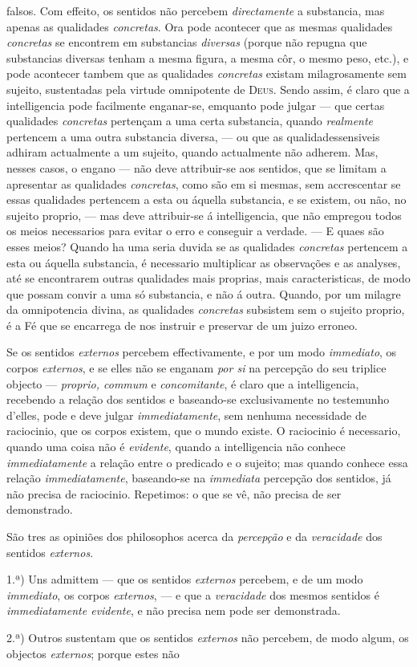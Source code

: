 falsos. Com effeito, os sentidos não percebem \emph{directamente} a substancia, mas apenas as qualidades \emph{concretas}. Ora pode acontecer que as mesmas qualidades \emph{concretas} se encontrem em substancias \emph{diversas} (porque não repugna que substancias diversas tenham a mesma figura, a mesma côr, o mesmo peso, etc.), e pode acontecer tambem que as qualidades \emph{concretas} existam milagrosamente sem sujeito, sustentadas pela virtude omnipotente de \textsc{Deus}. Sendo assim, é claro que a intelligencia pode facilmente enganar-se, emquanto pode julgar --- que certas qualidades \emph{concretas} pertençam a uma certa substancia, quando \emph{realmente} pertencem a uma outra substancia diversa, --- ou que as qualidadessensiveis adhiram actualmente a um sujeito, quando actualmente não adherem. Mas, nesses casos, o engano --- não deve attribuir-se aos sentidos, que se limitam a apresentar as qualidades \emph{concretas}, como são em si mesmas, sem accrescentar se essas qualidades pertencem a esta ou áquella substancia, e se existem, ou não, no sujeito proprio, --- mas deve attribuir-se á intelligencia, que não empregou todos os meios necessarios para evitar o erro e conseguir a verdade. --- E quaes são esses meios? Quando ha uma seria duvida se as qualidades \emph{concretas} pertencem a esta ou áquella substancia, é necessario multiplicar as observações e as analyses, até se encontrarem outras qualidades mais proprias, mais caracteristicas, de modo que possam convir a uma só substancia, e não á outra. Quando, por um milagre da omnipotencia divina, as qualidades \emph{concretas} subsistem sem o sujeito proprio, é a Fé que se encarrega de nos instruir e preservar de um juizo erroneo.\par Se os sentidos \emph{externos} percebem effectivamente, e por um modo \emph{immediato}, os corpos \emph{externos}, e se elles não se enganam \emph{por si} na percepção do seu triplice objecto --- \emph{proprio, commum} e \emph{concomitante}, é claro que a intelligencia, recebendo a relação dos sentidos e baseando-se exclusivamente no testemunho d'elles, pode e deve julgar \emph{immediatamente}, sem nenhuma necessidade de raciocinio, que os corpos existem, que o mundo existe. O raciocinio é necessario, quando uma coisa não é \emph{evidente}, quando a intelligencia não conhece \emph{immediatamente} a relação entre o predicado e o sujeito; mas quando conhece essa relação \emph{immediatamente}, baseando-se na \emph{immediata} percepção dos sentidos, já não precisa de raciocinio. Repetimos: o que se vê, não precisa de ser demonstrado.\par *\par São tres as opiniões dos philosophos acerca da \emph{percepção} e da \emph{veracidade} dos sentidos \emph{externos}.\par 1.ª) Uns admittem --- que os sentidos \emph{externos} percebem, e de um modo \emph{immediato}, os corpos \emph{externos}, --- e que a \emph{veracidade} dos mesmos sentidos é \emph{immediatamente evidente}, e não precisa nem pode ser demonstrada.\par 2.ª) Outros sustentam que os sentidos \emph{externos} não percebem, de modo algum, os objectos \emph{externos}; porque estes não 